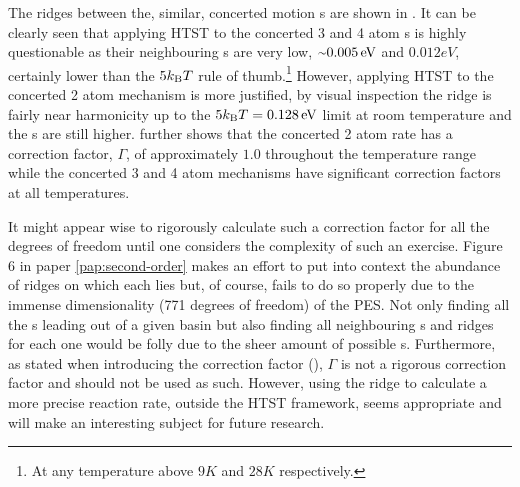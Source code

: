 The ridges between the, similar, concerted motion s are shown in .
It can be clearly seen that applying HTST to the concerted 3 and 4 atom s is highly questionable as their neighbouring s are very low, $\mytilde 0.005\unit{eV}$ and $0.012\unit{eV}$, certainly lower than the $5k_\text{B} T$ rule of thumb.\footnote{At any temperature above $9\unit{K}$ and $28\unit{K}$ respectively.}
However, applying HTST to the concerted 2 atom mechanism is more justified, by visual inspection the ridge is fairly near harmonicity up to the $5k_\text{B} T = 0.128\, \mathrm{eV}$ limit at room temperature and the s are still higher.
 further shows that the concerted 2 atom rate has a correction factor, $\Gamma$, of approximately $1.0$ throughout the temperature range while the concerted 3 and 4 atom mechanisms have significant correction factors at all temperatures.

It might appear wise to rigorously calculate such a correction factor for all the degrees of freedom until one considers the complexity of such an exercise.
Figure 6 in paper \ref{pap:second-order} makes an effort to put into context the abundance of ridges on which each  lies but, of course, fails to do so properly due to the immense dimensionality (771 degrees of freedom) of the PES.
Not only finding all the s leading out of a given basin but also finding all neighbouring s and ridges for each one would be folly due to the sheer amount of possible \sap{}s.
Furthermore, as stated when introducing the correction factor (), $\Gamma$ is not a rigorous correction factor and should not be used as such.
However, using the ridge to calculate a more precise reaction rate, outside the HTST framework, seems appropriate and will make an interesting subject for future research.

